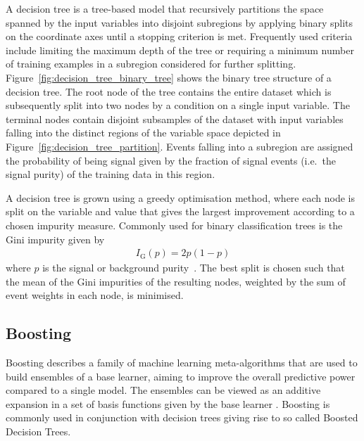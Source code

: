 A decision tree is a tree-based model that recursively partitions the space
spanned by the input variables into disjoint subregions by applying binary
splits on the coordinate axes until a stopping criterion is met. Frequently used
criteria include limiting the maximum depth of the tree or requiring a minimum
number of training examples in a subregion considered for further splitting.
Figure~\ref{fig:decision_tree_binary_tree} shows the binary tree structure of a
decision tree. The root node of the tree contains the entire dataset which is
subsequently split into two nodes by a condition on a single input variable. The
terminal nodes contain disjoint subsamples of the dataset with input variables
falling into the distinct regions of the variable space depicted in
Figure~\ref{fig:decision_tree_partition}. Events falling into a subregion are
assigned the probability of being signal given by the fraction of signal events
(i.e.\ the signal purity) of the training data in this region.

A decision tree is grown using a greedy optimisation method, where each node is
split on the variable and value that gives the largest improvement according to
a chosen impurity measure. Commonly used for binary classification trees is the
Gini impurity given by
\begin{align*}
  I_\text{G}(p) = 2 p (1 - p)
\end{align*}
where $p$ is the signal or background purity~\cite{esl}. The best split is
chosen such that the mean of the Gini impurities of the resulting nodes,
weighted by the sum of event weights in each node, is minimised.

\subsection{Boosting}
\label{sec:ml_boosting}

Boosting describes a family of machine learning meta-algorithms that are used to
build ensembles of a base learner, aiming to improve the overall predictive
power compared to a single model. The ensembles can be viewed as an additive
expansion in a set of basis functions given by the base learner \cite{esl}.
Boosting is commonly used in conjunction with decision trees giving rise to so
called Boosted Decision Trees.

